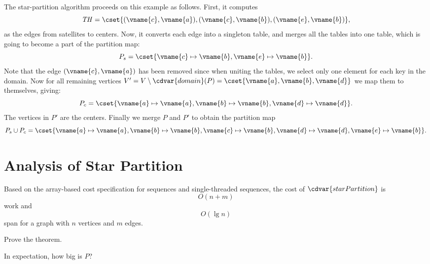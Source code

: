 \begin{group}
\begin{example}
The  star-partition algorithm proceeds on this example as follows.
%
First, it computes
%
\[
\mathit{TH} =
\cset{(\vname{c},\vname{a}),(\vname{c},\vname{b}),(\vname{e},\vname{b})},
\]
%
as the edges from satellites to centers.  
%
Now, it
converts each edge into a singleton table, and merges all the tables
into one
table, which is going to become a part of the partition map:
%
\[
P_s = \cset{\vname{c} \mapsto \vname{b},\vname{e} \mapsto \vname{b}}.
\]
%
Note that the edge $(\vname{c},\vname{a})$ has been removed since when
uniting the tables, we select only one element for each key in the
domain.  
%
Now for all remaining vertices
%
$V' = V \setminus \cdvar{domain}(P) = \cset{\vname{a},\vname{b},\vname{d}}$
we map them to themselves, giving:
%
\[
P_c = \cset{\vname{a} \mapsto \vname{a}, \vname{b} \mapsto \vname{b},
  \vname{d} \mapsto \vname{d}}.
\]
%
The vertices in $P'$ are the centers.
%
Finally we merge $P$ and $P'$ to obtain the partition map
%
\[
P_s \cup P_c = \cset{\vname{a} \mapsto \vname{a}, \vname{b} \mapsto \vname{b}, \vname{c} \mapsto \vname{b}, \vname{d} \mapsto
    \vname{d}, \vname{e} \mapsto \vname{b}}.
\]
\end{example}
\end{group}






\section{Analysis of Star Partition}
\label{sec:graphcon::star::partition-analysis}

\begin{theorem}
Based on the array-based cost specification for sequences and
single-threaded sequences, the cost of $\cdvar{starPartition}$ is 
\[
O(n + m)
\]
work and 
\[
O(\lg n)
\]
span for a graph with $n$ vertices and $m$ edges.
\end{theorem}
\begin{exercise}
Prove the theorem.
\end{exercise}

\begin{teachask}
 In expectation, how big is $P$?  
\end{teachask}



